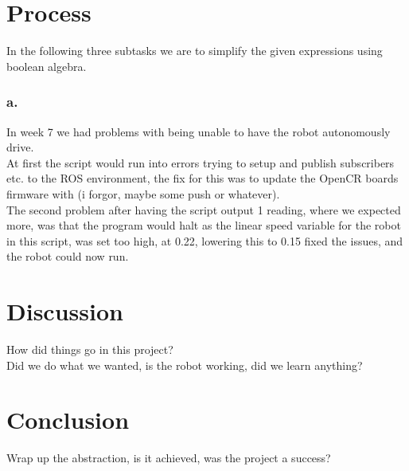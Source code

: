 \documentclass{article}
\begin{document}
\pagebreak

 \addtocounter{section}{1}
\section*{Process}
\noindent In the following three subtasks we are to simplify the given expressions using boolean algebra.
\subsubsection*{a.} 
In week 7 we had problems with being unable to have the robot autonomously drive.\\
At first the script would run into errors trying to setup and publish subscribers etc. to the ROS environment,
the fix for this was to update the OpenCR boards firmware with (i forgor, maybe some push or whatever).\\
The second problem after having the script output 1 reading, where we expected more, was that the program would
halt as the linear speed variable for the robot in this script, was set too high, at 0.22, lowering this to 0.15
fixed the issues, and the robot could now run.


\pagebreak


\section*{Discussion}
 \addtocounter{section}{1}
How did things go in this project? \\
Did we do what we wanted, is the robot working, did we learn anything?\\

\section*{Conclusion}
 \addtocounter{section}{1}
Wrap up the abstraction, is it achieved, was the project a success?

\vspace{3mm}
\end{document}

